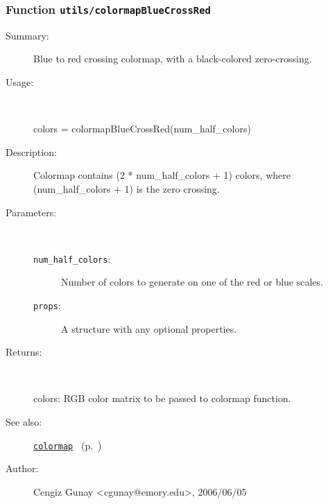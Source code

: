 \subsubsection[Function \texttt{colormapBlueCrossRed}]{Function \texttt{utils/colormapBlueCrossRed}}%
%
\label{ref_utils__colormapBlueCrossRed}%
\hypertarget{ref_utils__colormapBlueCrossRed}{}%
\begin{description}
\item[Summary:]Blue to red crossing colormap, with a black-colored zero-crossing.
%
\item[Usage:]~%
\begin{lyxcode}%
colors = colormapBlueCrossRed(num\_half\_colors)
%
\end{lyxcode}%
%
\item[Description:]%
Colormap contains (2 * num\_half\_colors + 1) colors, where (num\_half\_colors + 1) is the 
 zero crossing.
\item[Parameters:]~
\begin{description}%
\item[\texttt{num\_half\_colors}:]
 Number of colors to generate on one of the red or blue scales.
\item[\texttt{props}:]
 A structure with any optional properties.
\end{description}%
%
\item[Returns:]~

	colors: RGB color matrix to be passed to colormap function.
%
%
\item[See also:]%
\hyperlink{ref_colormap}{\texttt{colormap}}%
\ (p.~\pageref{ref_colormap})%
%
%
\item[Author:]%
Cengiz Gunay <cgunay@emory.edu>, 2006/06/05%
\end{description}
\methodline%


